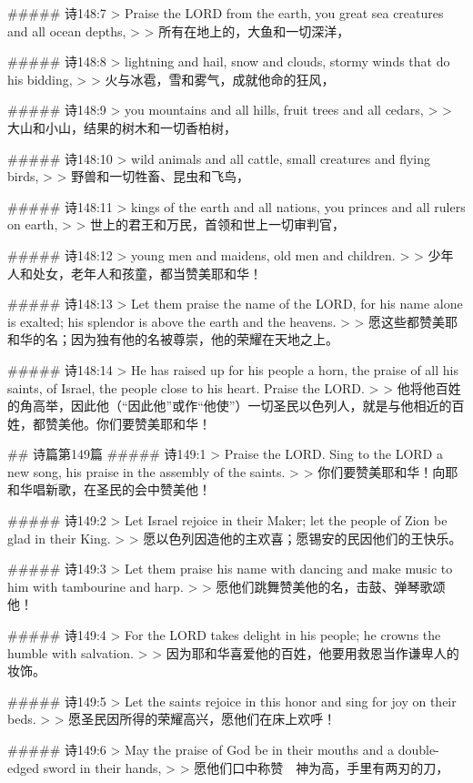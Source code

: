 ##### 诗148:7
> Praise the LORD from the earth, you great sea creatures and all ocean depths,
>
> 所有在地上的，大鱼和一切深洋，


##### 诗148:8
> lightning and hail, snow and clouds, stormy winds that do his bidding,
>
> 火与冰雹，雪和雾气，成就他命的狂风，


##### 诗148:9
> you mountains and all hills, fruit trees and all cedars,
>
> 大山和小山，结果的树木和一切香柏树，


##### 诗148:10
> wild animals and all cattle, small creatures and flying birds,
>
> 野兽和一切牲畜、昆虫和飞鸟，


##### 诗148:11
> kings of the earth and all nations, you princes and all rulers on earth,
>
> 世上的君王和万民，首领和世上一切审判官，


##### 诗148:12
> young men and maidens, old men and children.
>
> 少年人和处女，老年人和孩童，都当赞美耶和华！


##### 诗148:13
> Let them praise the name of the LORD, for his name alone is exalted; his splendor is above the earth and the heavens.
>
> 愿这些都赞美耶和华的名；因为独有他的名被尊崇，他的荣耀在天地之上。


##### 诗148:14
> He has raised up for his people a horn, the praise of all his saints, of Israel, the people close to his heart. Praise the LORD.
>
> 他将他百姓的角高举，因此他（“因此他”或作“他使”）一切圣民以色列人，就是与他相近的百姓，都赞美他。你们要赞美耶和华！


## 诗篇第149篇
##### 诗149:1
> Praise the LORD. Sing to the LORD a new song, his praise in the assembly of the saints.
>
> 你们要赞美耶和华！向耶和华唱新歌，在圣民的会中赞美他！


##### 诗149:2
> Let Israel rejoice in their Maker; let the people of Zion be glad in their King.
>
> 愿以色列因造他的主欢喜；愿锡安的民因他们的王快乐。


##### 诗149:3
> Let them praise his name with dancing and make music to him with tambourine and harp.
>
> 愿他们跳舞赞美他的名，击鼓、弹琴歌颂他！


##### 诗149:4
> For the LORD takes delight in his people; he crowns the humble with salvation.
>
> 因为耶和华喜爱他的百姓，他要用救恩当作谦卑人的妆饰。


##### 诗149:5
> Let the saints rejoice in this honor and sing for joy on their beds.
>
> 愿圣民因所得的荣耀高兴，愿他们在床上欢呼！


##### 诗149:6
> May the praise of God be in their mouths and a double-edged sword in their hands,
>
> 愿他们口中称赞　神为高，手里有两刃的刀，


